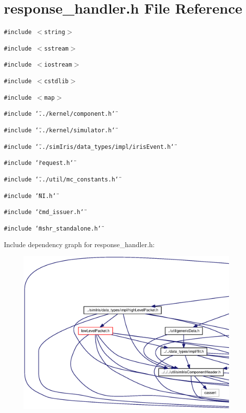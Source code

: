 \section{response\_\-handler.h File Reference}
\label{response__handler_8h}
{\tt \#include $<$string$>$}\par
{\tt \#include $<$sstream$>$}\par
{\tt \#include $<$iostream$>$}\par
{\tt \#include $<$cstdlib$>$}\par
{\tt \#include $<$map$>$}\par
{\tt \#include \char`\"{}../kernel/component.h\char`\"{}}\par
{\tt \#include \char`\"{}../kernel/simulator.h\char`\"{}}\par
{\tt \#include \char`\"{}../simIris/data\_\-types/impl/irisEvent.h\char`\"{}}\par
{\tt \#include \char`\"{}request.h\char`\"{}}\par
{\tt \#include \char`\"{}../util/mc\_\-constants.h\char`\"{}}\par
{\tt \#include \char`\"{}NI.h\char`\"{}}\par
{\tt \#include \char`\"{}cmd\_\-issuer.h\char`\"{}}\par
{\tt \#include \char`\"{}mshr\_\-standalone.h\char`\"{}}\par


Include dependency graph for response\_\-handler.h:\nopagebreak
\begin{figure}[H]
\begin{center}
\leavevmode
\includegraphics[width=420pt]{response__handler_8h__incl}
\end{center}
\end{figure}


